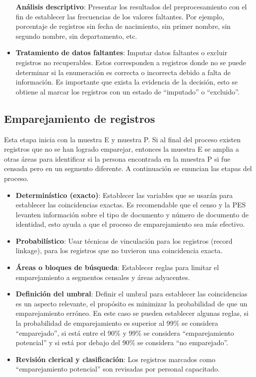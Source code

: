 \documentclass[
  12pt,
]{book}
\providecommand{\tightlist}{%
  \setlength{\itemsep}{0pt}\setlength{\parskip}{0pt}}
\begin{document}
\begin{itemize}
  \textbf{Análisis descriptivo}: Presentar los resultados del preprocesamiento con el fin de establecer las frecuencias de los valores faltantes. Por ejemplo, porcentaje de registros sin fecha de nacimiento, sin primer nombre, sin segundo nombre, sin departamento, etc.
\item
  \textbf{Tratamiento de datos faltantes}: Imputar datos faltantes o excluir registros no recuperables. Estos corresponden a registros donde no se puede determinar si la enumeración es correcta o incorrecta debido a falta de información. Es importante que exista la evidencia de la decisión, esto se obtiene al marcar los registros con un estado de ``imputado'' o ``excluido''.
\end{itemize}

\subsection{Emparejamiento de registros}\label{emparejamiento-de-registros}

Esta etapa inicia con la muestra E y muestra P. Si al final del proceso existen registros que no se han logrado emparejar, entonces la muestra E se amplia a otras áreas para identificar si la persona encontrada en la muestra P si fue censada pero en un segmento diferente. A continuación se enuncian las etapas del proceso.

\begin{itemize}
\tightlist
\item
  \textbf{Determinístico (exacto)}: Establecer las variables que se usarán para establecer las coincidencias exactas. Es recomendable que el censo y la PES levanten información sobre el tipo de documento y número de documento de identidad, esto ayuda a que el proceso de emparejamiento sea más efectivo.
\item
  \textbf{Probabilístico}: Usar técnicas de vinculación para los registros (record linkage), para los registros que no tuvieron una coincidencia exacta.
\item
  \textbf{Áreas o bloques de búsqueda}: Establecer reglas para limitar el emparejamiento a segmentos censales y áreas adyacentes.
\item
  \textbf{Definición del umbral}: Definir el umbral para establecer las coincidencias es un aspecto relevante, el propósito es minimizar la probabilidad de que un emparejamiento erróneo. En este caso se pueden establecer algunas reglas, si la probabilidad de emparejamiento es superior al 99\% se considera ``emparejado'', si está entre el 90\% y 99\% se considera ``emparejamiento potencial'' y si está por debajo del 90\% se considera ``no emparejado''.
\item
  \textbf{Revisión clerical y clasificación}: Los registros marcados como ``emparejamiento potencial'' son revisadas por personal capacitado.
\end{itemize}
\end{document}
